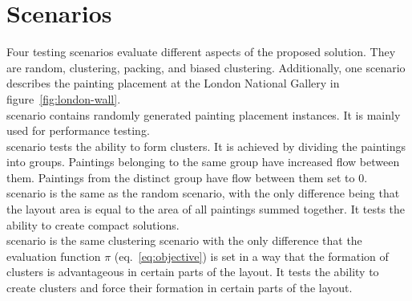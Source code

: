\section{Scenarios}\label{sec:scenarios}

Four testing scenarios evaluate different aspects of the proposed solution.
They are random, clustering, packing, and biased clustering.
Additionally, one scenario describes the painting placement at the London National Gallery in figure~\ref{fig:london-wall}. \\

 scenario contains randomly generated painting placement instances.
It is mainly used for performance testing.
\\

 scenario tests the ability to form clusters.
It is achieved by dividing the paintings into groups.
Paintings belonging to the same group have increased flow between them.
Paintings from the distinct group have flow between them set to 0.
\\

 scenario is the same as the random scenario, with the only difference being that the layout area is equal to the area of all paintings summed together.
It tests the ability to create compact solutions.
\\

 scenario is the same clustering scenario with the only difference
that the evaluation function $\pi$ (eq.~\ref{eq:objective})
is set in a way that the formation of clusters is advantageous in certain parts of the layout.
It tests the ability to create clusters and force their formation in certain parts of the layout.\\
